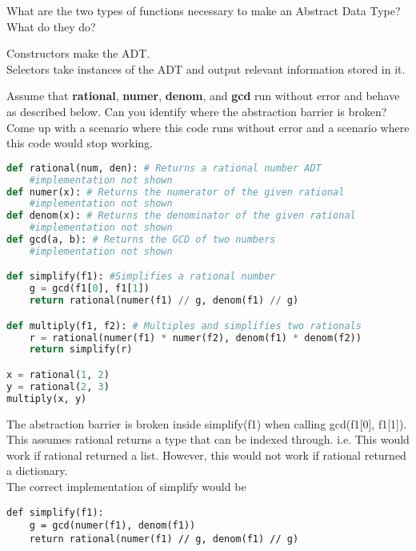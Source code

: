 
\question
What are the two types of functions necessary to make an Abstract Data Type? What do they do?

\begin{solution}[0.25in]
Constructors make the ADT.\\
Selectors take instances of the ADT and output relevant information stored in it.
\end{solution}

\question
Assume that \textbf{rational}, \textbf{numer}, \textbf{denom}, and \textbf{gcd} run without error and behave as described below. Can you identify where the abstraction barrier is broken? Come up with a scenario where this code runs without error and a scenario where this code would stop working.

\begin{lstlisting}[language=Python]
def rational(num, den): # Returns a rational number ADT
    #implementation not shown
def numer(x): # Returns the numerator of the given rational
    #implementation not shown
def denom(x): # Returns the denominator of the given rational
    #implementation not shown
def gcd(a, b): # Returns the GCD of two numbers
    #implementation not shown

def simplify(f1): #Simplifies a rational number
    g = gcd(f1[0], f1[1])
    return rational(numer(f1) // g, denom(f1) // g)

def multiply(f1, f2): # Multiples and simplifies two rationals
    r = rational(numer(f1) * numer(f2), denom(f1) * denom(f2))
    return simplify(r)

x = rational(1, 2)
y = rational(2, 3)
multiply(x, y)
\end{lstlisting}

\begin{solution}
The abstraction barrier is broken inside simplify(f1) when calling gcd(f1[0], f1[1]). This assumes rational returns a type that can be indexed through. i.e. This would work if rational returned a list. However, this would not work if rational returned a dictionary.\\

The correct implementation of simplify would be\\
\begin{verbatim}
def simplify(f1): 
    g = gcd(numer(f1), denom(f1))
    return rational(numer(f1) // g, denom(f1) // g)
\end{verbatim}
\end{solution}


